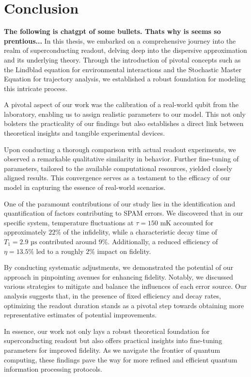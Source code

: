 \chapter{Conclusion}\label{chap:conclusion}
\textbf{The following is chatgpt of some bullets. Thats why is seems so prentious...}
In this thesis, we embarked on a comprehensive journey into the realm of superconducting readout, delving deep into the dispersive approximation and its underlying theory. Through the introduction of pivotal concepts such as the Lindblad equation for environmental interactions and the Stochastic Master Equation for trajectory analysis, we established a robust foundation for modeling this intricate process.

A pivotal aspect of our work was the calibration of a real-world qubit from the laboratory, enabling us to assign realistic parameters to our model. This not only bolsters the practicality of our findings but also establishes a direct link between theoretical insights and tangible experimental devices.

Upon conducting a thorough comparison with actual readout experiments, we observed a remarkable qualitative similarity in behavior. Further fine-tuning of parameters, tailored to the available computational resources, yielded closely aligned results. This convergence serves as a testament to the efficacy of our model in capturing the essence of real-world scenarios.

One of the paramount contributions of our study lies in the identification and quantification of factors contributing to SPAM errors. We discovered that in our specific system, temperature fluctuations at $\tau = 150 \text{ mK}$ accounted for approximately $22\%$ of the infidelity, while a characteristic decay time of $T_1 = 2.9 \text{ µs}$ contributed around $9\%$. Additionally, a reduced efficiency of $\eta = 13.5 \%$ led to a roughly $2\%$ impact on fidelity.

By conducting systematic adjustments, we demonstrated the potential of our approach in pinpointing avenues for enhancing fidelity. Notably, we discussed various strategies to mitigate and balance the influences of each error source. Our analysis suggests that, in the presence of fixed efficiency and decay rates, optimizing the readout duration stands as a pivotal step towards obtaining more representative estimates of potential improvements.

In essence, our work not only lays a robust theoretical foundation for superconducting readout but also offers practical insights into fine-tuning parameters for improved fidelity. As we navigate the frontier of quantum computing, these findings pave the way for more refined and efficient quantum information processing protocols.

